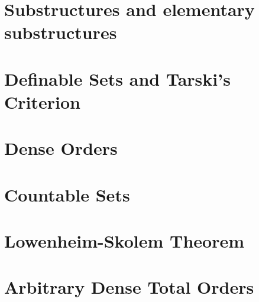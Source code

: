 \documentclass{article}
\begin{document}
\section{Substructures and elementary substructures}

\section{Definable Sets and Tarski's Criterion}

\section{Dense Orders}

\section{Countable Sets}

\section{Lowenheim-Skolem Theorem}

\section{Arbitrary Dense Total Orders}
\end{document}
